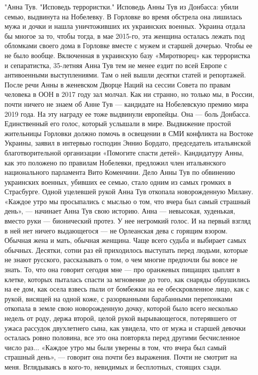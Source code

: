 "Анна Тув. "Исповедь террористки." Исповедь Анны Тув из Донбасса: убили семью, выдвинута на Нобелевку. В Горловке во время обстрела она лишилась мужа и дочки и нашла уничтоживших их украинских военных. Украина отдала бы многое за то, чтобы тогда, в мае 2015-го, эта женщина осталась лежать под обломками своего дома в Горловке вместе с мужем и старшей дочерью. Чтобы ее не было вообще.
Включенная в украинскую базу «Миротворец» как террористка и сепаратистка, 35-летняя Анна Тув тем не менее ездит по всей Европе с антивоенными выступлениями. Там о ней вышли десятки статей и репортажей.
После речи Анны в женевском Дворце Наций на сессии Совета по правам человека в ООН в 2017 году зал молчал.
Как ни странно, но только мы, в России, почти ничего не знаем об Анне Тув — кандидате на Нобелевскую премию мира 2019 года. На эту награду ее тоже выдвинули европейцы.
Она — боль Донбасса. Единственный его голос, который услышали в мире.
Выдвижение простой жительницы Горловки должно помочь в освещении в СМИ конфликта на Востоке Украины, заявил в интервью господин Эннио Бордато, председатель итальянской благотворительной организации «Помогите спасти детей».
Кандидатуру Анны, как это положено по правилам Нобелевки, предложил член итальянского национального парламента Вито Коменчини. Дело Анны Тув по обвинению украинских военных, убивших ее семью, стало одним из самых громких в Страсбурге.
Одной уцелевшей рукой Анна Тув откопала новорожденную Милану.
«Каждое утро мы просыпались с мыслью о том, что вчера был самый страшный день», — начинает Анна Тув свою историю.
Анна — невысокая, худенькая, вместо руки — бионический протез. У нее негромкий голос. И на первый взгляд в ней нет ничего выдающегося — не Орлеанская дева с горящим взором.
Обычная жена и мать, обычная женщина. Чаще всего судьба и выбирает самых обычных.
Десятки, сотни раз ей приходилось выступать перед людьми, которые не знают русского, рассказывать о том, о чем многие предпочли бы вовсе не знать.
То, что она говорит сегодня мне — про оранжевых пищащих цыплят в клетке, которых пыталась спасти за мгновение до того, как снаряды обрушились на ее дом, как осела взвесь пыли от бомбежки на ее обескровленное лицо, как с рукой, висящей на одной коже, с разорванными барабанными перепонками откопала в земле свою новорожденную дочку, которой было всего несколько недель от роду, держа второй, целой рукой вырывающегося, потерявшего от ужаса рассудок двухлетнего сына, как увидела, что от мужа и старшей девочки осталась ровно половина, все это она повторяла перед другими бесчисленное число раз...
«Каждое утро мы были уверены в том, что вчера был самый страшный день», — говорит она почти без выражения. Почти не смотрит на меня. Вглядываясь в кого-то, невидимых и бесплотных, стоящих сзади.
